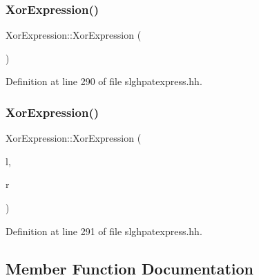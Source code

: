 \subsubsection{\texorpdfstring{XorExpression()}{XorExpression()}\hspace{0.1cm}{\footnotesize\ttfamily [1/2]}}
{\footnotesize\ttfamily Xor\+Expression\+::\+Xor\+Expression (\begin{DoxyParamCaption}\item[{void}]{ }\end{DoxyParamCaption})\hspace{0.3cm}{\ttfamily [inline]}}



Definition at line 290 of file slghpatexpress.\+hh.

\mbox{\label{class_xor_expression_a80177c9628416b0113febb32e36424aa}} 
\subsubsection{\texorpdfstring{XorExpression()}{XorExpression()}\hspace{0.1cm}{\footnotesize\ttfamily [2/2]}}
{\footnotesize\ttfamily Xor\+Expression\+::\+Xor\+Expression (\begin{DoxyParamCaption}\item[{\mbox{\hyperlink{class_pattern_expression}{Pattern\+Expression}} $\ast$}]{l,  }\item[{\mbox{\hyperlink{class_pattern_expression}{Pattern\+Expression}} $\ast$}]{r }\end{DoxyParamCaption})\hspace{0.3cm}{\ttfamily [inline]}}



Definition at line 291 of file slghpatexpress.\+hh.



\subsection{Member Function Documentation}
\mbox{\label{class_xor_expression_a36d35fdcd9283efaa711304fed75e9e6}} 
